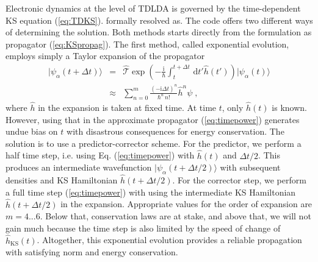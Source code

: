\documentclass[final,1p]{elsarticle}
\newcommand{\I}{\mathrm{i}}
\newcommand{\D}{\mathrm{d}}
\begin{document}
Electronic dynamics at the level of TDLDA is governed by the
time-dependent KS equation (\ref{eq:TDKS}).  formally resolved as. The
code offers two different ways of determining the solution. Both
methods starts directly from the formulation as propagator
(\ref{eq:KSpropag}). The first method, called exponential evolution,
employs simply a Taylor expansion of the propagator
\begin{eqnarray}
  |\psi_\alpha(t\!+\!\Delta t)\rangle
  &=&
  \hat{\mathcal{T}}\exp\left(-\frac{\I}{\hbar}
   \int_t^{t+\Delta t}\,\D t'\hat h(t')\right)
  |\psi_\alpha(t)\rangle
\nonumber\\
  &\approx&
  \sum_{n=0}^m
  \frac{(-\I\Delta t)^n}{\hbar^n\,n!}\hat{h}^n\psi\;,
  \label{eq:timepower}
\end{eqnarray}
where $\hat{h}$ in the expansion is taken at fixed time.  At time $t$,
only $\hat{h}(t)$ is known. However, using that in the approximate
propagator (\ref{eq:timepower}) generates undue bias on $t$ with
disastrous consequences for energy conservation. The solution is to
use a predictor-corrector scheme. For the predictor, we perform a half
time step, i.e. using Eq. (\ref{eq:timepower}) with $\hat{h}(t)$ and
$\Delta t/2$. This produces an intermediate wavefunction
$|\psi_\alpha(t\!+\!\Delta t/2)\rangle$ with subsequent densities and
KS Hamiltonian $\hat{h}(t\!+\!\Delta t/2)$. For the corrector step, we
perform a full time step (\ref{eq:timepower}) with using the
intermediate KS Hamiltonian $\hat{h}(t\!+\!\Delta t/2)$ in the
expansion. Appropriate values for the order of expansion are
$m=4...6$. Below that, conservation laws are at stake, and above that,
we will not gain much because the time step is also limited by the
speed of change of $\hat{h}_\mathrm{KS}(t)$. Altogether, this
exponential evolution provides a reliable propagation with satisfying
norm and energy conservation.
\end{document}

